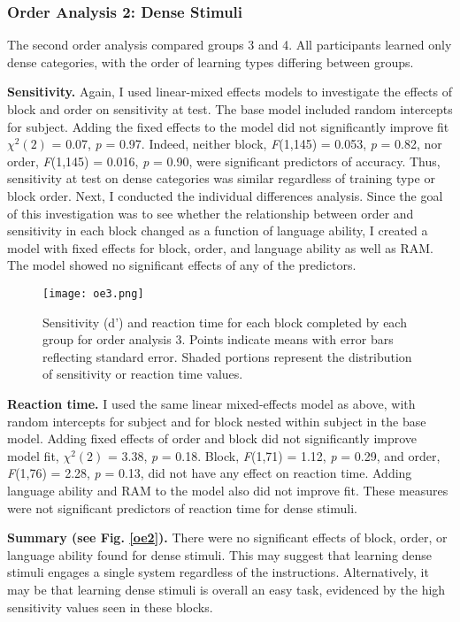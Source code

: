 \documentclass[../dissertation.tex]{subfiles}
\begin{document}
\subsubsection{Order Analysis 2: Dense Stimuli}
	The second order analysis compared groups 3 and 4. All participants learned only dense categories, with the order of learning types differing between groups. \par
	\textbf{Sensitivity.} Again, I used linear-mixed effects models to investigate the effects of block and order on sensitivity at test. The base model included random intercepts for subject. Adding the fixed effects to the model did not significantly improve fit $\chi^{2}(2)$ = 0.07,  \textit{p} = 0.97. Indeed, neither block, \textit{F}(1,145) = 0.053, \textit{p} = 0.82, nor order, \textit{F}(1,145) = 0.016, \textit{p} = 0.90, were significant predictors of accuracy. Thus, sensitivity at test on dense categories was similar regardless of training type or block order.
	Next, I conducted the individual differences analysis. Since the goal of this investigation was to see whether the relationship between order and sensitivity in each block changed as a function of language ability, I created a model with fixed effects for block, order, and language ability as well as RAM. The model showed no significant effects of any of the predictors. \par 
	
\begin{wrapfigure}{R}{0.55\textwidth}
\vspace{-10pt}
\texttt{[image: oe3.png]}
\caption[Sensitivity and reaction time for order analysis 3]{Sensitivity (d')  and reaction time for each block completed by each group for order analysis 3. Points indicate means with error bars reflecting standard error. Shaded portions represent the distribution of sensitivity or reaction time values.}
\label{oe3}
\vspace{-20pt}
\end{wrapfigure}	
	
	
	\textbf{Reaction time.} I used the same linear mixed-effects model as above, with random intercepts for subject and for block nested within subject in the base model. Adding fixed effects of order and block did not significantly improve model fit, $\chi^{2}(2)$ = 3.38, \textit{p} = 0.18. Block, \textit{F}(1,71) = 1.12, \textit{p} = 0.29, and order, \textit{F}(1,76) = 2.28, \textit{p} = 0.13, did not have any effect on reaction time. Adding language ability and RAM to the model also did not improve fit. These measures were not significant predictors of reaction time for dense stimuli.\par
	\textbf{Summary (see Fig. \ref{oe2}).} There were no significant effects of block, order, or language ability found for dense stimuli. This may suggest that learning dense stimuli engages a single system regardless of the instructions. Alternatively, it may be that learning dense stimuli is overall an easy task, evidenced by the high sensitivity values seen in these blocks.
	
\end{document}
